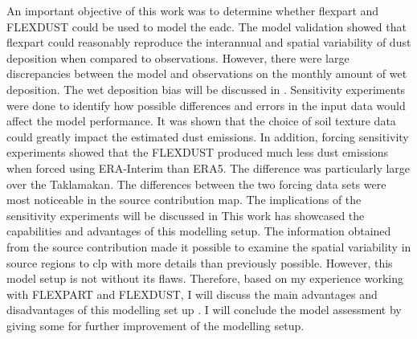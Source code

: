 An important objective of this work was to determine whether \acrshort{flexpart} and FLEXDUST could be used to model the \acrshort{eadc}. The model validation showed that \acrshort{flexpart} could reasonably reproduce the interannual and spatial variability of dust deposition when compared to observations. 
However, there were large discrepancies between the model and observations on the monthly amount of wet deposition. 
The wet deposition bias will be discussed in . 
Sensitivity experiments were done to identify how possible differences and errors in the input data would affect the model performance. 
It was shown that the choice of soil texture data could greatly impact the estimated dust emissions. 
In addition, forcing sensitivity experiments showed that the FLEXDUST produced much less dust emissions when forced using ERA-Interim than ERA5. 
The difference was particularly large over the Taklamakan. 
The differences between the two forcing data sets were most noticeable in the source contribution map.
The implications of the sensitivity experiments will be discussed in 
This work has showcased the capabilities and advantages of this modelling setup. 
The information obtained from the source contribution made it possible to examine the spatial variability in source regions to \acrshort{clp} with more details than previously possible. 
However, this model setup is not without its flaws. 
Therefore, based on my experience working with FLEXPART and FLEXDUST, I will discuss the main advantages and disadvantages of this modelling set up  . I will conclude the model assessment by giving some for further improvement of the modelling setup.

